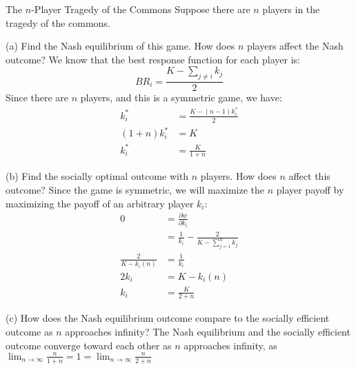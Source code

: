 \documentclass[10pt]{extarticle}
\begin{document}
  \begin{problem}{The $n$-Player Tragedy of the Commons}
    Suppose there are $n$ players in the tragedy of the commons.
    \begin{problem}{(a)}
      Find the Nash equilibrium of this game. How does $n$ players affect the Nash outcome?
      \tcblower
      We know that the best response function for each player is:
      \[
        BR_i = \frac{K - \sum_{j \neq i}k_j}{2}
      \] 
      Since there are $n$ players, and this is a symmetric game, we have:
      \begin{align*}
        k_i^* &= \frac{K - (n-1)k_i^*}{2}\\
        (1+n)k_{i}^* &= K\\
        k_{i}^* &= \frac{K}{1+n}
      \end{align*}
    \end{problem}
    \begin{problem}{(b)}
      Find the socially optimal outcome with $n$ players. How does $n$ affect this outcome?
      \tcblower
      Since the game is symmetric, we will maximize the $n$ player payoff by maximizing the payoff of an arbitrary player $k_i$:
      \begin{align*}
        0 &= \frac{\partial w}{\partial k_i}\\
          &= \frac{1}{k_i} - \frac{2}{K-\sum_{j=1}^{n}k_j}\\
        \frac{2}{K-k_i(n)} &= \frac{1}{k_i} \tag*{since the game is symmetric}\\
        2 k_i &= K-k_i(n)\\
        k_i &= \frac{K}{2+n}
      \end{align*}
    \end{problem}
    \begin{problem}{(c)}
      How does the Nash equilibrium outcome compare to the socially efficient outcome as $n$ approaches infinity?
      \tcblower
      The Nash equilibrium and the socially efficient outcome converge toward each other as $n$ approaches infinity, as $\lim_{n\rightarrow\infty}\frac{n}{1+n} = 1 = \lim_{n\rightarrow\infty}\frac{n}{2+n}$
    \end{problem}
  \end{problem}
\end{document}

